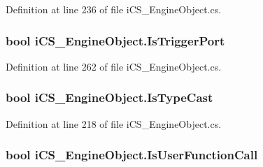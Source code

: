 Definition at line 236 of file i\+C\+S\+\_\+\+Engine\+Object.\+cs.

\hypertarget{classi_c_s___engine_object_a3119b32f372ab45ca8f8919f1f739bb2}{
\subsubsection[{Is\+Trigger\+Port}]{\setlength{\rightskip}{0pt plus 5cm}bool i\+C\+S\+\_\+\+Engine\+Object.\+Is\+Trigger\+Port\hspace{0.3cm}{\ttfamily [get]}}}\label{classi_c_s___engine_object_a3119b32f372ab45ca8f8919f1f739bb2}


Definition at line 262 of file i\+C\+S\+\_\+\+Engine\+Object.\+cs.

\hypertarget{classi_c_s___engine_object_a7f4a02001235ff67b03dfd753fdb2a4b}{
\subsubsection[{Is\+Type\+Cast}]{\setlength{\rightskip}{0pt plus 5cm}bool i\+C\+S\+\_\+\+Engine\+Object.\+Is\+Type\+Cast\hspace{0.3cm}{\ttfamily [get]}}}\label{classi_c_s___engine_object_a7f4a02001235ff67b03dfd753fdb2a4b}


Definition at line 218 of file i\+C\+S\+\_\+\+Engine\+Object.\+cs.

\hypertarget{classi_c_s___engine_object_a62e99c663cbfcee672e451f4f9a462db}{
\subsubsection[{Is\+User\+Function\+Call}]{\setlength{\rightskip}{0pt plus 5cm}bool i\+C\+S\+\_\+\+Engine\+Object.\+Is\+User\+Function\+Call\hspace{0.3cm}{\ttfamily [get]}}}\label{classi_c_s___engine_object_a62e99c663cbfcee672e451f4f9a462db}


